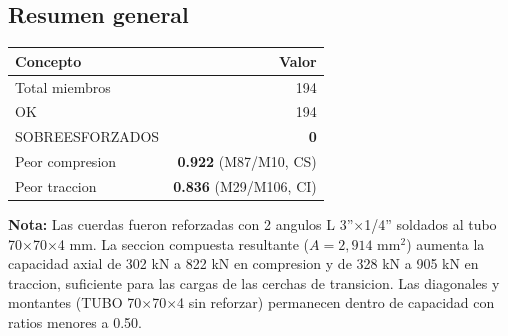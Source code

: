 \documentclass[12pt,a4paper]{article}
\newcommand{\tableheadrow}{\rowcolor{primary!15}\sffamily\footnotesize\bfseries\color{primary}}
\begin{document}
\subsection{Resumen general}
\begin{center}
\begin{tabular}{l r}
\toprule
\tableheadrow
\textbf{Concepto} & \textbf{Valor} \\
\midrule
Total miembros & 194 \\
OK & \textcolor{secondary!80!black}{194} \\
\rowcolor{tablerow}
SOBREESFORZADOS & \textcolor{accent}{\textbf{0}} \\
Peor compresion & \textbf{0.922} (M87/M10, CS) \\
\rowcolor{tablerow}
Peor traccion & \textbf{0.836} (M29/M106, CI) \\
\bottomrule
\end{tabular}
\end{center}

{\sffamily\small\color{secondary!80!black}
\textbf{Nota:} Las cuerdas fueron reforzadas con 2 angulos L 3''$\times$1/4''
soldados al tubo 70$\times$70$\times$4 mm. La seccion compuesta resultante
($A=2{,}914$ mm$^2$) aumenta la capacidad axial de 302 kN a 822 kN en compresion
y de 328 kN a 905 kN en traccion, suficiente para las cargas de las cerchas
de transicion. Las diagonales y montantes (TUBO 70$\times$70$\times$4 sin reforzar)
permanecen dentro de capacidad con ratios menores a 0.50.
}

\end{document}
